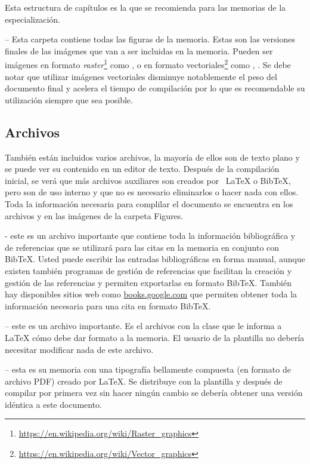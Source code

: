 Esta estructura de capítulos es la que se recomienda para las memorias de la especialización.

 -- Esta carpeta contiene todas las figuras de la memoria.  Estas son las versiones finales de las imágenes que van a ser incluidas en la memoria.  Pueden ser imágenes en formato \textit{raster}\footnote{\url{https://en.wikipedia.org/wiki/Raster_graphics}} como ,  o en formato vectoriales\footnote{\url{https://en.wikipedia.org/wiki/Vector_graphics}} como , .  Se debe notar que utilizar imágenes vectoriales disminuye notablemente el peso del documento final y acelera el tiempo de compilación por lo que es recomendable su utilización siempre que sea posible.

\subsection{Archivos}

También están incluidos varios archivos, la mayoría de ellos son de texto plano y se puede ver su contenido en un editor de texto. Después de la compilación inicial, se verá que más archivos auxiliares son creados por \ LaTeX{} o BibTeX, pero son de uso interno y que no es necesario eliminarlos o hacer nada con ellos.  Toda la información necesaria para complilar el documento se encuentra en los archivos  y en las imágenes de la carpeta Figures.

 - este es un archivo importante que contiene toda la información bibliográfica y de referencias que se utilizará para las citas en la memoria en conjunto con BibTeX. Usted puede escribir las entradas bibliográficas en forma manual, aunque existen también programas de gestión de referencias que facilitan la creación y gestión de las referencias y permiten exportarlas en formato BibTeX.  También hay disponibles sitios web como \url{books.google.com} que permiten obtener toda la información necesaria para una cita en formato BibTeX.

 -- este es un archivo importante. Es el archivos con la clase que le informa a \LaTeX{} cómo debe dar formato a la memoria. El usuario de la plantilla no debería necesitar modificar nada de este archivo.

 -- esta es su memoria con una tipografía bellamente compuesta (en formato de archivo PDF) creado por \LaTeX{}. Se distribuye con la plantilla y después de compilar por primera vez sin hacer ningún cambio se debería obtener una versión idéntica a este documento.

